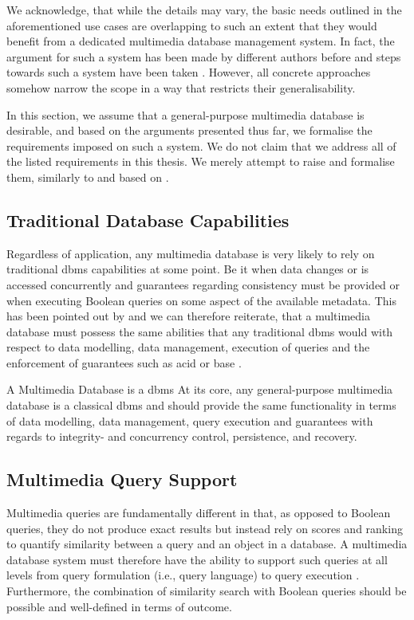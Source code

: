 We acknowledge, that while the details may vary, the basic needs outlined in the aforementioned use cases are overlapping to such an extent that they would benefit from a dedicated multimedia database management system. In fact, the argument for such a system has been made by different authors before \cite{Adjeroh:1997Multimedia,Smeulders:2000Content,Jonsson:2016Ten,Jonsson:2019Data,Khaleel:2021An} and steps towards such a system have been taken \cite{Giangreco:2018Database,Wang:2021Milvus}. However, all concrete approaches somehow narrow the scope in a way that restricts their generalisability.

In this section, we assume that a general-purpose multimedia database is desirable, and based on the arguments presented thus far, we formalise the requirements imposed on such a system. We do not claim that we address all of the listed requirements in this thesis. We merely attempt to raise and formalise them, similarly to and based on \cite{Adjeroh:1997Multimedia,Jonsson:2016Ten,Khaleel:2021An}.

\subsection{Traditional Database Capabilities}
Regardless of application, any multimedia database is very likely to rely on traditional \acrshort{dbms} capabilities at some point. Be it when data changes or is accessed concurrently and guarantees regarding consistency must be provided or when executing Boolean queries on some aspect of the available metadata. This has been pointed out by \cite{Adjeroh:1997Multimedia,Khaleel:2021An} and we can therefore reiterate, that a multimedia database must possess the same abilities that any traditional \acrshort{dbms} would with respect to data modelling, data management, execution of queries and the enforcement of guarantees such as \acrshort{acid} \cite{Haerder:1983principles} or \acrshort{base} \cite{Pritchett:2008Base}.

\begin{requirement}[label=requirement:classical_dbms]{A Multimedia Database is a \acrshort{dbms}}{}
    At its core, any general-purpose multimedia database is a classical \acrlong{dbms} and should provide the same functionality in terms of data modelling, data management, query execution and guarantees with regards to integrity- and concurrency control, persistence, and recovery.
\end{requirement}

\subsection{Multimedia Query Support}
Multimedia queries are fundamentally different in that, as opposed to Boolean queries, they do not produce exact results but instead rely on scores and ranking to quantify similarity between a query and an object in a database. A multimedia database system must therefore have the ability to support such queries at all levels from query formulation (i.e., query language) to query execution \cite{Adjeroh:1997Multimedia}. Furthermore, the combination of similarity search with Boolean queries should be possible and well-defined in terms of outcome.

